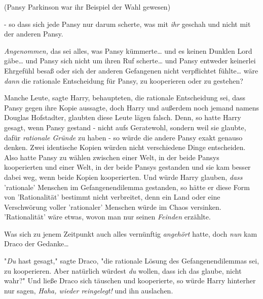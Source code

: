 {(Pansy Parkinson war ihr Beispiel der Wahl gewesen)

- so dass sich jede Pansy nur darum scherte, was mit \emph{ihr} geschah und nicht mit der anderen Pansy.

\emph{Angenommen,} das sei alles, was Pansy kümmerte… und es keinen Dunklen Lord gäbe… und Pansy sich nicht um ihren Ruf scherte… und Pansy entweder keinerlei Ehrgefühl besaß oder sich der anderen Gefangenen nicht verpflichtet fühlte… wäre \emph{dann} die rationale Entscheidung für Pansy, zu kooperieren oder zu gestehen?

Manche Leute, sagte Harry, behaupteten, die rationale Entscheidung sei, dass Pansy gegen ihre Kopie aussagte, doch Harry und außerdem noch jemand namens Douglas Hofstadter, glaubten diese Leute lägen falsch. Denn, so hatte Harry gesagt, wenn Pansy gestand - nicht aufs Geratewohl, sondern weil sie glaubte, dafür \emph{rationale Gründe} zu haben - so würde die andere Pansy exakt genauso denken. Zwei identische Kopien würden nicht verschiedene Dinge entscheiden. Also hatte Pansy zu wählen zwischen einer Welt, in der beide Pansys kooperierten und einer Welt, in der beide Pansys gestanden und sie kam besser dabei weg, wenn beide Kopien kooperierten. Und würde Harry glauben, \emph{dass} 'rationale' Menschen im Gefangenendilemma gestanden, so hätte er diese Form von 'Rationalität' bestimmt nicht verbreitet, denn ein Land oder eine Verschwörung voller 'rationaler' Menschen würde im Chaos versinken. 'Rationalität' wäre etwas, wovon man nur seinen \emph{Feinden} erzählte.

Was sich zu jenem Zeitpunkt auch alles vernünftig \emph{angehört} hatte, doch \emph{nun} kam Draco der Gedanke…

"\emph{Du} hast gesagt," sagte Draco, "die rationale Lösung des Gefangenendilemmas sei, zu kooperieren. Aber natürlich würdest \emph{du} wollen, dass ich das glaube, nicht wahr?" Und ließe Draco sich täuschen und kooperierte, so würde Harry hinterher nur sagen, \emph{Haha, wieder reingelegt!} und ihn auslachen.

}
